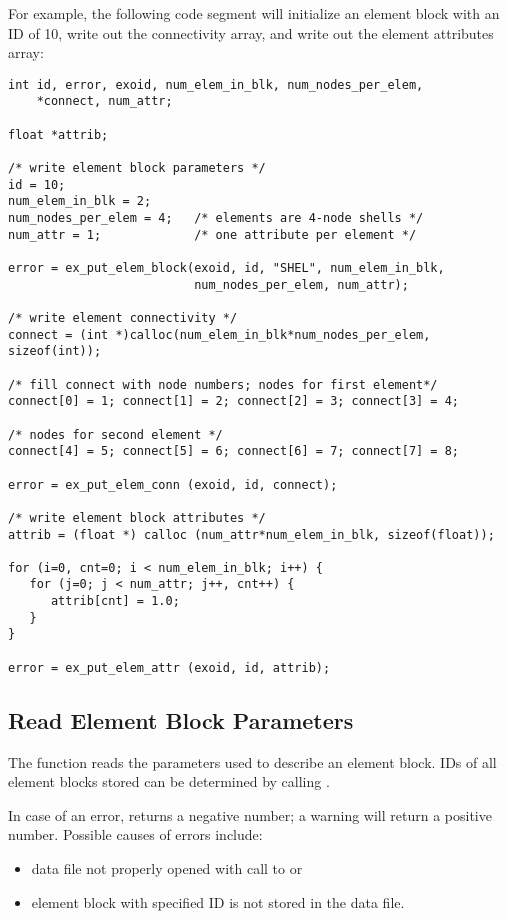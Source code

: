 For example, the following code segment will initialize an 
element block with an ID of 10, write out the connectivity array, 
and write out the element attributes array:
\begin{lstlisting}
int id, error, exoid, num_elem_in_blk, num_nodes_per_elem,
    *connect, num_attr;

float *attrib;

/* write element block parameters */
id = 10;
num_elem_in_blk = 2;
num_nodes_per_elem = 4;   /* elements are 4-node shells */
num_attr = 1;             /* one attribute per element */

error = ex_put_elem_block(exoid, id, "SHEL", num_elem_in_blk, 
                          num_nodes_per_elem, num_attr);

/* write element connectivity */
connect = (int *)calloc(num_elem_in_blk*num_nodes_per_elem, sizeof(int));

/* fill connect with node numbers; nodes for first element*/
connect[0] = 1; connect[1] = 2; connect[2] = 3; connect[3] = 4;

/* nodes for second element */
connect[4] = 5; connect[5] = 6; connect[6] = 7; connect[7] = 8;

error = ex_put_elem_conn (exoid, id, connect);

/* write element block attributes */
attrib = (float *) calloc (num_attr*num_elem_in_blk, sizeof(float));

for (i=0, cnt=0; i < num_elem_in_blk; i++) {
   for (j=0; j < num_attr; j++, cnt++) {
      attrib[cnt] = 1.0;
   }
}

error = ex_put_elem_attr (exoid, id, attrib);
\end{lstlisting}

\subsection{Read Element Block Parameters}\label{s:gebparam}

The function  reads the parameters used to
describe an element block. IDs of all element blocks stored can be
determined by calling .

In case of an error,  returns a negative
number; a warning will return a positive number. Possible causes of
errors include:


\begin{itemize}
 \item data file not properly opened with call to  
or 

 \item element block with specified ID is not stored in 
the data file.
\end{itemize}

